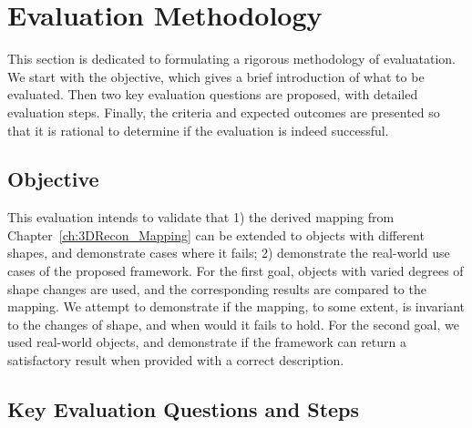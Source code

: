 \section{Evaluation Methodology}
\label{sec:interp_eval_methodology}
This section is dedicated to formulating a rigorous methodology of evaluatation. We start with the objective, which gives a brief introduction of what to be evaluated. Then two key evaluation questions are proposed, with detailed evaluation steps. Finally, the criteria and expected outcomes are presented so that it is rational to determine if the evaluation is indeed successful.

\subsection{Objective}
This evaluation intends to validate that 1) the derived mapping from Chapter~\ref{ch:3DRecon_Mapping} can be extended to objects with different shapes, and demonstrate cases where it fails; 2) demonstrate the real-world use cases of the proposed framework. For the first goal, objects with varied degrees of shape changes are used, and the corresponding results are compared to the mapping. We attempt to demonstrate if the mapping, to some extent, is invariant to the changes of shape, and when would it fails to hold. For the second goal, we used real-world objects, and demonstrate if the framework can return a satisfactory result when provided with a correct description.



\subsection{Key Evaluation Questions and Steps}

